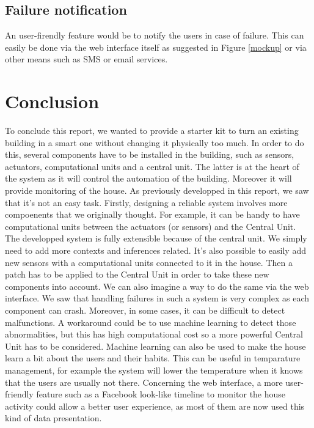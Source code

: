 \documentclass{acm_proc_article-sp}
\begin{document}
\subsection{Failure notification}
An user-firendly feature would be to notify the users in case of failure. This can easily be done via the web interface itself as suggested in Figure \ref{mockup} or via other means such as SMS or email services.

\section{Conclusion}
To conclude this report, we wanted to provide a starter kit to turn an existing building in a smart one without changing it physically too much. 
In order to do this, several components have to be installed in the building, such as sensors, actuators, computational units and a central unit. 
The latter is at the heart of the system as it will control the automation of the building. 
Moreover it will provide monitoring of the house. 
As previously developped in this report, we saw that it's not an easy task. 
Firstly, designing a reliable system involves more compoenents that we originally thought. 
For example, it can be handy to have computational units between the actuators (or sensors) and the Central Unit. 
The developped system is fully extensible because of the central unit. We simply need to add more contexts and inferences related. 
It's also possible to easily add new sensors with a computational units connected to it in the house. 
Then a patch has to be applied to the Central Unit in order to take these new components into account. 
We can also imagine a way to do the same via the web interface. 
We saw that handling failures in such a system is very complex as each component can crash. 
Moreover, in some cases, it can be difficult to detect malfunctions. 
A workaround could be to use machine learning to detect those abnormalities, but this has high computational cost so a more powerful Central Unit has to be considered. 
Machine learning can also be used to make the house learn a bit about the users and their habits. 
This can be useful in temparature management, for example the system will lower the temperature when it knows that the users are usually not there. 
Concerning the web interface, a more user-friendly feature such as a Facebook look-like timeline to monitor the house activity could allow a better user experience, as most of them are now used this kind of data presentation. 



\nocite{*}

\end{document}
